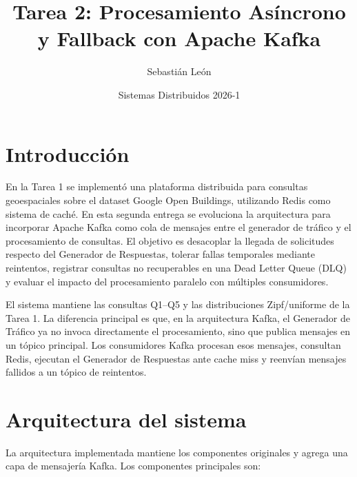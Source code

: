 \documentclass[11pt,letterpaper]{article}
\title{Tarea 2: Procesamiento Asíncrono y Fallback con Apache Kafka}
\author{Sebastián León}
\date{Sistemas Distribuidos 2026-1}
\begin{document}
\maketitle

\section{Introducción}

En la Tarea 1 se implementó una plataforma distribuida para consultas geoespaciales sobre el dataset Google Open Buildings, utilizando Redis como sistema de caché. En esta segunda entrega se evoluciona la arquitectura para incorporar Apache Kafka como cola de mensajes entre el generador de tráfico y el procesamiento de consultas. El objetivo es desacoplar la llegada de solicitudes respecto del Generador de Respuestas, tolerar fallas temporales mediante reintentos, registrar consultas no recuperables en una Dead Letter Queue (DLQ) y evaluar el impacto del procesamiento paralelo con múltiples consumidores.

El sistema mantiene las consultas Q1--Q5 y las distribuciones Zipf/uniforme de la Tarea 1. La diferencia principal es que, en la arquitectura Kafka, el Generador de Tráfico ya no invoca directamente el procesamiento, sino que publica mensajes en un tópico principal. Los consumidores Kafka procesan esos mensajes, consultan Redis, ejecutan el Generador de Respuestas ante cache miss y reenvían mensajes fallidos a un tópico de reintentos.

\section{Arquitectura del sistema}

La arquitectura implementada mantiene los componentes originales y agrega una capa de mensajería Kafka. Los componentes principales son:
\end{document}
